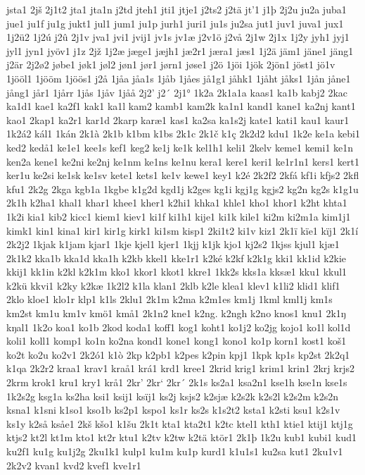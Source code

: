 jsta1
2jš
2j1t2
jta1
jta1n
j2td
jteh1
jti1
jtje1
j2ts2
j2tä
jt'1
j1þ
2j2u
ju2a
juba1
jue1
ju1f
ju1g
jukt1
jul1
jum1
ju1p
jurh1
juri1
ju1s
ju2sa
jut1
juv1
juva1
jux1
1j2ü2
1j2ú
j2û
2j1v
jva1
jvi1
jvij1
jv1s
jv1æ
j2v1ö
j2vå
2j1w
2j1x
1j2y
jyh1
jyj1
jyl1
jyn1
jyöv1
j1z
2jž
1j2æ
jæge1
jæjh1
jæ2r1
jæra1
jæs1
1j2ä
jäm1
jäne1
jäng1
j2är
2j2ø2
jøbe1
jøk1
jøl2
jøn1
jør1
jørn1
jøse1
j2ö
1jöi
1jök
2jön1
jöst1
jö1v
1jööl1
1jööm
1jöös1
j2å
1jåa
jåa1s
1jåb
1jåes
jå1g1
jåhk1
1jåht
jåks1
1jån
jåne1
jång1
jår1
1jårr
1jås
1jåv
1jåå
2j2'
j2´
2j1°
1k2a
2k1a1a
kaas1
ka1b
kabj2
2kac
ka1d1
kae1
ka2f1
kak1
ka1l
kam2
kamb1
kam2k
ka1n1
kand1
kane1
ka2nj
kant1
kao1
2kap1
ka2r1
kar1d
2karp
karæ1
kas1
ka2sa
ka1s2j
kate1
kati1
kau1
kaur1
1k2á2
kál1
1kán
2k1à
2k1b
k1bm
k1bs
2k1c
2k1č
k1ç
2k2d2
kdu1
1k2e
ke1a
kebi1
ked2
kedå1
ke1e1
kee1s
kef1
keg2
ke1j
ke1k
kel1h1
keli1
2kelv
keme1
kemi1
ke1n
ken2a
kene1
ke2ni
ke2nj
ke1nm
ke1ns
ke1nu
kera1
kere1
keri1
ke1r1n1
kers1
kert1
ker1u
ke2si
ke1sk
ke1sv
kete1
kets1
ke1v
kewe1
key1
k2é
2k2f2
2kfá
kf1i
kfjs2
2kfl
kfu1
2k2g
2kga
kgb1a
1kgbe
k1g2d
kgd1j
k2ges
kg1i
kgj1g
kgjs2
kg2n
kg2s
k1g1u
2k1h
k2ha1
khal1
khar1
khee1
kher1
k2hi1
khka1
khle1
kho1
khor1
k2ht
khta1
1k2i
kia1
kib2
kicc1
kiem1
kiev1
ki1f
ki1h1
kije1
ki1k
kile1
ki2m
ki2m1a
kim1j1
kimk1
kin1
kina1
kir1
kir1g
kirk1
ki1sm
kisp1
2ki1t2
ki1v
kiz1
2k1ï
kïe1
kïj1
2k1í
2k2j2
1kjak
k1jam
kjar1
1kje
kjel1
kjer1
1kjj
k1jk
kjo1
kj2s2
1kjss
kjul1
kjæ1
2k1k2
kka1b
kka1d
kka1h
k2kb
kkel1
kke1r1
k2ké
k2kf
k2k1g
kki1
kk1id
k2kie
kkij1
kk1in
k2kl
k2k1m
kko1
kkor1
kkot1
kkre1
1kk2s
kks1a
kksæ1
kku1
kkul1
k2kü
kkvi1
k2ky
k2kæ
1k2l2
k1la
klan1
2klb
k2le
klea1
klev1
k1li2
klid1
klif1
2klo
kloe1
klo1r
klp1
k1ls
2klu1
2k1m
k2ma
k2m1es
km1j
1kml
kml1j
km1s
km2st
km1u
km1v
kmö1
kmå1
2k1n2
kne1
k2ng.
k2ngh
k2no
knos1
knu1
2k1ŋ
kŋal1
1k2o
koa1
ko1b
2kod
koda1
koff1
kog1
koht1
ko1j2
ko2jg
kojo1
ko1l
kol1d
koli1
koll1
komp1
ko1n
ko2na
kond1
kone1
kong1
kono1
ko1p
korn1
kost1
koš1
ko2t
ko2u
ko2v1
2k2ó1
k1ò
2kp
k2pb1
k2pes
k2pin
kpj1
1kpk
kp1s
kp2st
2k2q1
k1qa
2k2r2
kraa1
krav1
kraå1
krá1
krd1
kree1
2krid
krig1
krim1
krin1
2krj
krjs2
2krm
krok1
kru1
kry1
krå1
2kr'
2kr`
2kr´
2k1s
ks2a1
ksa2n1
kse1h
kse1n
kse1s
1k2s2g
ksg1a
ks2ha
ksi1
ksij1
ksïj1
ks2j
ksjs2
k2sjæ
k2s2k
k2s2l
k2s2m
k2s2n
ksna1
k1sni
k1so1
kso1b
ks2p1
kspo1
ks1r
ks2s
k1s2t2
ksta1
k2sti
ksu1
k2s1v
ks1y
k2så
ksåe1
2kš
kšo1
k1šu
2k1t
kta1
kta2t1
k2tc
ktel1
kth1
ktie1
ktij1
ktj1g
ktjs2
kt2l
kt1m
kto1
kt2r
ktu1
k2tv
k2tw
k2tä
ktör1
2k1þ
1k2u
kub1
kubi1
kud1
ku2f1
ku1g
ku1j2g
2ku1k1
kulp1
ku1m
ku1p
kurd1
k1u1s1
ku2sa
kut1
2ku1v1
2k2v2
kvan1
kvd2
kvef1
kve1r1
